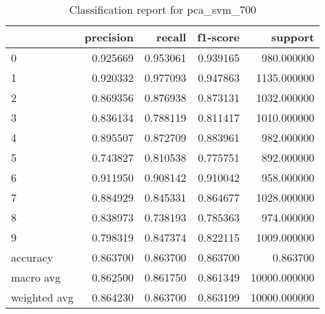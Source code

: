\begin{table}[htb!]
\centering
\caption{Classification report for pca_svm_700}
\label{tab:classification-report-pca_svm_700}
\begin{tabular}{lrrrr}
\toprule
 & precision & recall & f1-score & support \\
\midrule
0 & 0.925669 & 0.953061 & 0.939165 & 980.000000 \\
1 & 0.920332 & 0.977093 & 0.947863 & 1135.000000 \\
2 & 0.869356 & 0.876938 & 0.873131 & 1032.000000 \\
3 & 0.836134 & 0.788119 & 0.811417 & 1010.000000 \\
4 & 0.895507 & 0.872709 & 0.883961 & 982.000000 \\
5 & 0.743827 & 0.810538 & 0.775751 & 892.000000 \\
6 & 0.911950 & 0.908142 & 0.910042 & 958.000000 \\
7 & 0.884929 & 0.845331 & 0.864677 & 1028.000000 \\
8 & 0.838973 & 0.738193 & 0.785363 & 974.000000 \\
9 & 0.798319 & 0.847374 & 0.822115 & 1009.000000 \\
accuracy & 0.863700 & 0.863700 & 0.863700 & 0.863700 \\
macro avg & 0.862500 & 0.861750 & 0.861349 & 10000.000000 \\
weighted avg & 0.864230 & 0.863700 & 0.863199 & 10000.000000 \\
\bottomrule
\end{tabular}
\end{table}
